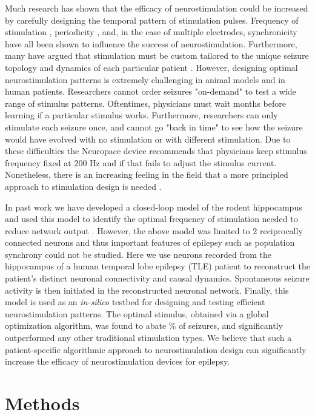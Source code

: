 \documentclass[11pt,a4paper,final]{article}
\begin{document}
Much research has shown that the efficacy of neurostimulation could be increased by carefully designing the temporal pattern of stimulation pulses.
Frequency of stimulation \citep{chkhenkeli97,cordeiro13}, periodicity \autocite{wyckhuys10,buffel14}, and, in the case of multiple electrodes, synchronicity \citep{nelson11,van14} have all been shown to influence the success of neurostimulation.
Furthermore, many have argued that stimulation must be custom tailored to the unique seizure topology and dynamics of each particular patient \citep{holt14,wendling13,taylor15}.
However, designing optimal neurostimulation patterns is extremely challenging in animal models and in human patients.
Researchers cannot order seizures "on-demand" to test a wide range of stimulus patterns.
Oftentimes, physicians must wait months before learning if a particular stimulus works.
Furthermore, researchers can only stimulate each seizure once, and cannot go "back in time" to see how the seizure would have evolved with no stimulation or with different stimulation.
Due to these difficulties the Neuropace device recommends that physicians keep stimulus frequency fixed at 200 Hz and if that fails to adjust the stimulus current.
Nonetheless, there is an increasing feeling in the field that a more principled approach to stimulation design is needed \citep{netoff15}.

In past work we have developed a closed-loop model of the rodent hippocampus and used this model to identify the optimal frequency of stimulation needed to reduce network output \citep{sandler15clpp}.
However, the above model was limited to 2 reciprocally connected neurons and thus important features of epilepsy such as population synchrony could not be studied.
Here we use \nn{} neurons recorded from the hippocampus of a human temporal lobe epilepsy (TLE) patient to reconstruct the patient's distinct neuronal connectivity and causal dynamics.
Spontaneous seizure activity is then initiated in the reconstructed neuronal network.
Finally, this model is used as an \textit{in-silico} testbed for designing and testing efficient neurostimulation patterns.
The optimal stimulus, obtained via a global optimization algorithm, was found to abate \success{}\% of seizures, and significantly outperformed any other traditional stimulation types.
We believe that such a patient-specific algorithmic approach to neurostimulation design can significantly increase the efficacy of neurostimulation devices for epilepsy.


\section{Methods \label{SM}}
\end{document}
